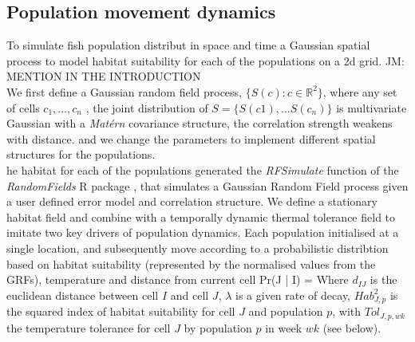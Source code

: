 \documentclass[review]{elsarticle}
\let\oldequation\equation
\let\oldendequation\endequation
\renewenvironment{equation}
 {\linenomathNonumbers\oldequation}
 {\oldendequation\endlinenomath}
\begin{document}
\subsection{Population movement dynamics}

To simulate  fish population
distribut in space and time a Gaussian spatial process  to
model habitat suitability for each of the populations on a 2d grid. JM: MENTION
IN THE INTRODUCTION \\

We first define a Gaussian random
field process, $\{S(c) :
c \in \mathbb{R}^2\}$,  where
 any set of cells $c_{1}, \dots, c_{n}$ , the joint distribution of $S =
\{S(c1),\dots S(c_{n})\}$ is multivariate Gaussian with a \textit{Matérn}
covariance structure,
 the correlation strength weakens with
distance.
 and we change the parameters to
implement different spatial structures for the populations. \\

he habitat for each of the
populations  generated 
the \textit{RFSimulate} function of the \textit{RandomFields} R package
\citep{Schlater2015}, that simulates a Gaussian Random Field process given a
user defined error model and correlation structure. We define a stationary
habitat field and combine with a temporally dynamic thermal tolerance field to
imitate two key drivers of population dynamics. Each population
 initialised at a single location, and subsequently
move according to a probabilistic
distribtion based on habitat suitability (represented by the
normalised values from the GRFs), temperature and distance
from current cell 
\begin{equation}
	Pr(J | I) = 
\end{equation}
Where $d_{IJ}$ is the euclidean distance between cell $I$ and cell $J$,
$\lambda$ is a given rate of decay, $Hab_{J,p}^2$ is the squared index of
habitat suitability for cell $J$ and population $p$, with $Tol_{J,p,wk}$ the
temperature tolerance for cell $J$ by population $p$ in week $wk$ (see
below).\\
\end{document}
